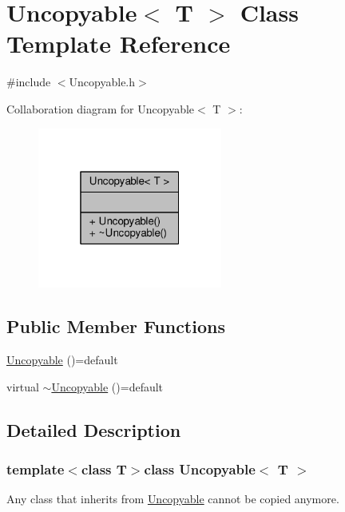 \hypertarget{classUncopyable}{\section{Uncopyable$<$ T $>$ Class Template Reference}
\label{classUncopyable}
}


{\ttfamily \#include $<$Uncopyable.\-h$>$}



Collaboration diagram for Uncopyable$<$ T $>$\-:
\nopagebreak
\begin{figure}[H]
\begin{center}
\leavevmode
\includegraphics[width=172pt]{classUncopyable__coll__graph}
\end{center}
\end{figure}
\subsection*{Public Member Functions}
\begin{DoxyCompactItemize}
\item 
\hyperlink{classUncopyable_a0bc763ca9cd76c8ba90daf1785e6050f}{Uncopyable} ()=default
\item 
virtual \hyperlink{classUncopyable_a74637df43efaf007e36124722f611dae}{$\sim$\-Uncopyable} ()=default
\end{DoxyCompactItemize}


\subsection{Detailed Description}
\subsubsection*{template$<$class T$>$class Uncopyable$<$ T $>$}

Any class that inherits from \hyperlink{classUncopyable}{Uncopyable} cannot be copied anymore.


